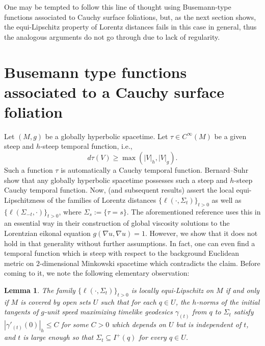 \documentclass[a4paper,11pt]{article}
\numberwithin{equation}{section}
\theoremstyle{definition}
\theoremstyle{plain}
\newtheorem{Lemma}[Definition]{Lemma}
\begin{document}
One may be tempted to follow this line of thought using Busemann-type functions associated to Cauchy surface foliations, but, as  the next section shows, the equi-Lipschitz property of Lorentz distances fails in this case in general, thus the analogous arguments do not go through due to lack of regularity.

\section{Busemann type functions associated to a Cauchy surface foliation}

Let $(M,g)$ be a globally hyperbolic spacetime. Let $\tau \in C^\infty(M)$ be a given steep and $h$-steep temporal function, i.e., 
\begin{equation}
\label{eq: steep and h steep}
    d\tau(V) \geq \max(|V|_h, |V|_g).
\end{equation}
Such a function $\tau$ is automatically a Cauchy temporal function. Bernard--Suhr \cite{BernardSuhr} show that any globally hyperbolic spacetime possesses such a steep and $h$-steep Cauchy temporal function. Now, \cite[Lemma 3.2]{ZhuWuCui} (and subsequent results) assert the local equi-Lipschitzness of the families of Lorentz distances $\{\ell(\cdot,\Sigma_t)\}_{t > 0}$ as well as $\{\ell(\Sigma_{-t},\cdot)\}_{t > 0}$, where $\Sigma_s:=\{\tau = s\}$. The aforementioned reference uses this in an essential way in their construction of global viscosity solutions to the Lorentzian eikonal equation $g(\nabla u,\nabla u) = 1$. However, we show that it does not hold in that generality without further assumptions. In fact, one can even find a temporal function which is steep with respect to the background Euclidean metric on $2$-dimensional Minkowski spacetime which contradicts the claim. Before coming to it, we note the following elementary observation:

\begin{Lemma}
\label{Lemma: blowup of initial tangents}
The family $\{\ell(\cdot,\Sigma_t)\}_{t > 0}$ is locally equi-Lipschitz on $M$ if and only if $M$ is covered by open sets $U$ such that for each $q \in U$, the $h$-norms of the initial tangents of $g$-unit speed maximizing timelike geodesics $\gamma_{(t)}$ from $q$ to $\Sigma_t$ satisfy $|\gamma'_{(t)}(0)|_h \leq C$ for some $C > 0$ which depends on $U$ but is independent of $t$, and $t$ is large enough so that $\Sigma_t \subseteq I^+(q)$ for every $q \in U$.
\end{Lemma}
\end{document}

